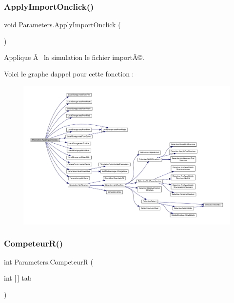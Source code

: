 \subsubsection{\texorpdfstring{Apply\+Import\+Onclick()}{ApplyImportOnclick()}}
{\footnotesize\ttfamily void Parameters.\+Apply\+Import\+Onclick (\begin{DoxyParamCaption}{ }\end{DoxyParamCaption})\hspace{0.3cm}{\ttfamily [inline]}}



Applique Ã  la simulation le fichier importÃ©. 

Voici le graphe d\textquotesingle{}appel pour cette fonction \+:
\nopagebreak
\begin{figure}[H]
\begin{center}
\leavevmode
\includegraphics[width=350pt]{class_parameters_a8438e2686a572fc6d1cc2947489da01d_cgraph}
\end{center}
\end{figure}
\mbox{\label{class_parameters_a9eb50f6a67cb480f303e5d6f91997f7d}} 
\subsubsection{\texorpdfstring{Competeur\+R()}{CompeteurR()}}
{\footnotesize\ttfamily int Parameters.\+CompeteurR (\begin{DoxyParamCaption}\item[{int \mbox{[}$\,$\mbox{]}}]{tab }\end{DoxyParamCaption})\hspace{0.3cm}{\ttfamily [inline]}}



